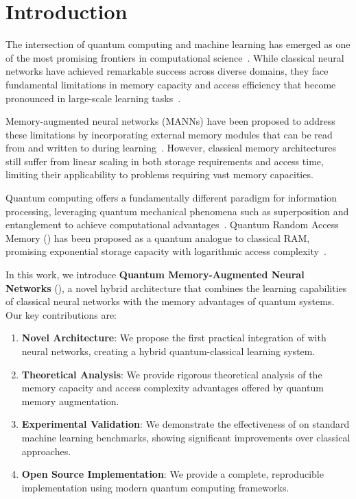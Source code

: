 \section{Introduction}
\label{sec:intro}

The intersection of quantum computing and machine learning has emerged as one of the most promising frontiers in computational science~\cite{biamonte2017quantum, schuld2015introduction}. While classical neural networks have achieved remarkable success across diverse domains, they face fundamental limitations in memory capacity and access efficiency that become pronounced in large-scale learning tasks~\cite{graves2016hybrid, santoro2016meta}. 

Memory-augmented neural networks (MANNs) have been proposed to address these limitations by incorporating external memory modules that can be read from and written to during learning~\cite{graves2014neural, weston2014memory}. However, classical memory architectures still suffer from linear scaling in both storage requirements and access time, limiting their applicability to problems requiring vast memory capacities.

Quantum computing offers a fundamentally different paradigm for information processing, leveraging quantum mechanical phenomena such as superposition and entanglement to achieve computational advantages~\cite{nielsen2010quantum}. Quantum Random Access Memory (\qram) has been proposed as a quantum analogue to classical RAM, promising exponential storage capacity with logarithmic access complexity~\cite{giovannetti2008quantum, park2019circuit}.

In this work, we introduce \textbf{Quantum Memory-Augmented Neural Networks} (\qmnn), a novel hybrid architecture that combines the learning capabilities of classical neural networks with the memory advantages of quantum systems. Our key contributions are:

\begin{enumerate}
    \item \textbf{Novel Architecture}: We propose the first practical integration of \qram with neural networks, creating a hybrid quantum-classical learning system.
    
    \item \textbf{Theoretical Analysis}: We provide rigorous theoretical analysis of the memory capacity and access complexity advantages offered by quantum memory augmentation.
    
    \item \textbf{Experimental Validation}: We demonstrate the effectiveness of \qmnn on standard machine learning benchmarks, showing significant improvements over classical approaches.
    
    \item \textbf{Open Source Implementation}: We provide a complete, reproducible implementation using modern quantum computing frameworks.
\end{enumerate}

